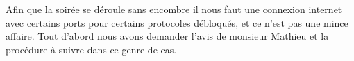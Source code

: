 Afin que la soirée se déroule sans encombre il nous faut une connexion internet avec certains ports pour certains protocoles débloqués,
 et ce n'est pas une mince affaire. Tout d'abord nous avons demander l'avis de monsieur Mathieu et la procédure à suivre dans ce genre de cas.

